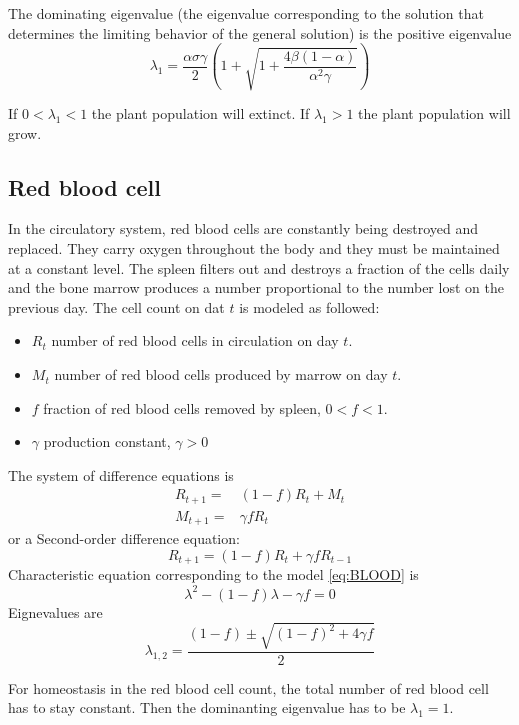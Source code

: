 The dominating eigenvalue (the eigenvalue corresponding to the solution that determines the limiting behavior of the general solution) is the positive eigenvalue
$$\lambda _{1}=\frac{\alpha \sigma \gamma }{2}\left (1+ \sqrt{1+\frac{4\beta  (1-\alpha)}{\alpha^2 \gamma }}\right )$$

If $0<\lambda _1 <1$ the plant population will extinct.
If $\lambda _1 >1$ the plant population will grow.






\subsection{Red blood cell}
In the circulatory system, red blood cells are constantly being destroyed and replaced. They carry oxygen throughout the body and they must be maintained at a constant level. The spleen filters out and destroys a fraction of the cells daily and the bone marrow produces a number proportional to the number lost on the previous day. The cell count on dat $t$ is modeled as followed:
\begin{itemize}
\item $R_t$ number of red blood cells in circulation on day $t$.
\item $M_t$ number of red blood cells produced by marrow on day $t$.
\item $f$ fraction of red blood cells removed by spleen, $0<f<1$.
\item $\gamma$ production constant, $\gamma >0$
\end{itemize}
The system of difference equations is
\begin{subequations}\label{eq:reblood}
\begin{align}
R_{t+1}=&(1-f)R_t+M_t\label{eq:reblood1}\\
M_{t+1}=&\gamma f R_t \label{eq:reblood2}
\end{align}   
\end{subequations} 
or a Second-order difference equation:
\begin{equation}\label{eq:BLOOD}
R_{t+1}=(1-f)R_t+\gamma f R_{t-1}
\end{equation}
Characteristic equation corresponding to the model \eqref{eq:BLOOD} is
$$\lambda ^2 - (1-f) \lambda -  \gamma f=0$$
Eignevalues are
$$\lambda_{1,2}=\frac{(1-f)\pm \sqrt{(1-f)^2 + 4 \gamma f}}{2}$$

For homeostasis in the red blood cell count, the total number of red blood cell has to stay constant. Then the dominanting eigenvalue has to be $\lambda_1 =1$.

